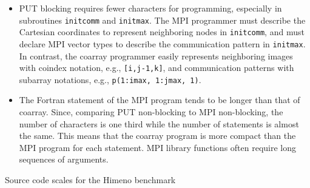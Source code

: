 \begin{itemize}
\item
PUT blocking requires fewer characters for programming,
especially in subroutines {\tt initcomm} and {\tt initmax}.
The MPI programmer must describe the Cartesian coordinates to represent neighboring nodes in {\tt initcomm}, and must declare MPI vector types to describe the communication pattern in {\tt initmax}. In contrast, the coarray programmer easily represents 
neighboring images with coindex notation, e.g., {\tt [i,j-1,k]}, and 
communication patterns with subarray notations, e.g., {\tt p(1:imax, 1:jmax, 1)}.

\item
The Fortran statement of the MPI program tends to be longer than that of coarray.
Since, comparing PUT non-blocking to MPI non-blocking,
the number of characters is one third while the number of statements is almost the same.
This means that the coarray program is more compact than the MPI program for each
statement. MPI library functions often require long sequences of arguments.

\end{itemize}


\begin{table}
 \caption{Source code scales for the Himeno benchmark}\label{tab:himeno-lines}
 \begin{center}
  
 \end{center}
\end{table}







